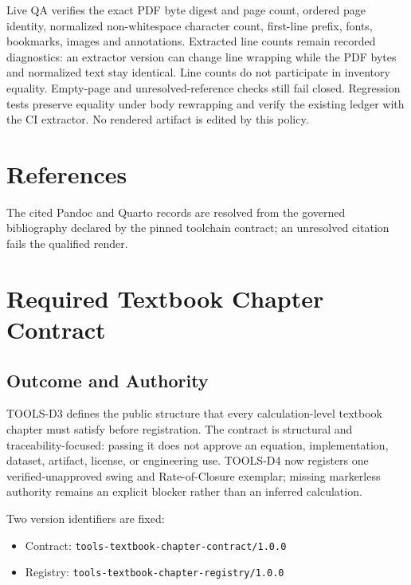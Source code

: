 \documentclass[
  american,
]{article}
\providecommand{\tightlist}{%
  \setlength{\itemsep}{0pt}\setlength{\parskip}{0pt}}
\begin{document}
Live QA verifies the exact PDF byte digest and page count, ordered page
identity, normalized non-whitespace character count, first-line prefix,
fonts, bookmarks, images and annotations. Extracted line counts remain
recorded diagnostics: an extractor version can change line wrapping
while the PDF bytes and normalized text stay identical. Line counts do
not participate in inventory equality. Empty-page and
unresolved-reference checks still fail closed. Regression tests preserve
equality under body rewrapping and verify the existing ledger with the
CI extractor. No rendered artifact is edited by this policy.

\section{References}\label{references}

The cited Pandoc and Quarto records are resolved from the governed
bibliography declared by the pinned toolchain contract; an unresolved
citation fails the qualified render.

\section{Required Textbook Chapter
Contract}\label{required-textbook-chapter-contract}

\subsection{Outcome and Authority}\label{outcome-and-authority-1}

TOOLS-D3 defines the public structure that every calculation-level
textbook chapter must satisfy before registration. The contract is
structural and traceability-focused: passing it does not approve an
equation, implementation, dataset, artifact, license, or engineering
use. TOOLS-D4 now registers one verified-unapproved swing and
Rate-of-Closure exemplar; missing markerless authority remains an
explicit blocker rather than an inferred calculation.

Two version identifiers are fixed:

\begin{itemize}
\tightlist
\item
  Contract: \texttt{tools-textbook-chapter-contract/1.0.0}
\item
  Registry: \texttt{tools-textbook-chapter-registry/1.0.0}
\end{itemize}
\end{document}
